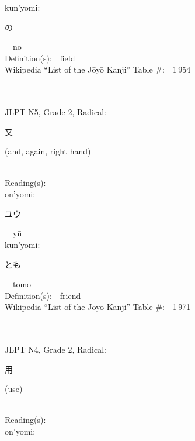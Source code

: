 \begin{multicols}{2}
{\hspace*{1em}}kun'yomi:\ \ \\
{\hspace*{2em}}{\begin{CJK}{UTF8}{min} の \end{CJK}}\ \ no\ \ \\
Definition(s):\ \ field \\
Wikipedia ``List of the J\=oy\=o Kanji'' Table \#:\ \ 1\,954 \\
\ \ \\
{\fontsize{34pt}{40pt}  }\ \ \\  %
{JLPT N5, Grade 2, Radical:\ \ {\begin{CJK}{UTF8}{min} 又 \end{CJK}} (and, again, right hand) } \\
Reading(s):\ \ \\
{\hspace*{1em}}on'yomi:\ \ \\
{\hspace*{2em}}{\begin{CJK}{UTF8}{min} ユウ \end{CJK}}\ \ y\=u\ \ \\
{\hspace*{1em}}kun'yomi:\ \ \\
{\hspace*{2em}}{\begin{CJK}{UTF8}{min} とも \end{CJK}}\ \ tomo\ \ \\
Definition(s):\ \ friend \\
Wikipedia ``List of the J\=oy\=o Kanji'' Table \#:\ \ 1\,971 \\
\ \ \\
{\fontsize{34pt}{40pt}  }\ \ \\  %
{JLPT N4, Grade 2, Radical:\ \ {\begin{CJK}{UTF8}{min} 用 \end{CJK}} (use) } \\
Reading(s):\ \ \\
{\hspace*{1em}}on'yomi:\ \ \\

\end{multicols}
